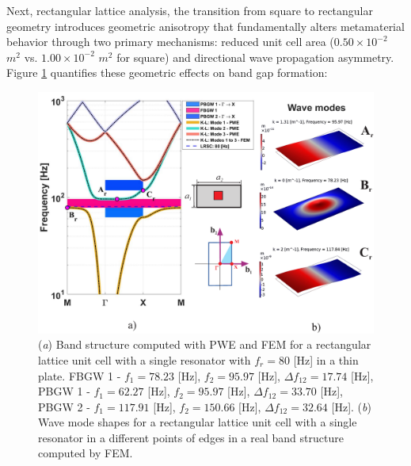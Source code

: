 \documentclass[review,numbers,sort&compress]{elsarticle}
\begin{document}
Next, rectangular lattice analysis, the transition from square to rectangular geometry introduces geometric anisotropy that fundamentally alters metamaterial behavior through two primary mechanisms: reduced unit cell area ($0.50 \times 10^{-2}$ $m^2$ vs. $1.00 \times 10^{-2}$ $m^2$ for square) and directional wave propagation asymmetry. Figure \ref{pwe_fem_disp_modal_rect} quantifies these geometric effects on band gap formation:
\newpage
\begin{figure}[htb]
	\centering
	\includegraphics[width=.8\textwidth]{1_2_disp_frf_rect.pdf}
	\caption{(\textit{a}) Band structure computed with PWE and FEM for a rectangular lattice unit cell with a single resonator with $f_r = 80$ [Hz] in a thin plate. FBGW 1 - $f_1 = 78.23$ [Hz], $f_2 = 95.97$ [Hz], $\Delta f_{12} = 17.74 $ [Hz], PBGW 1 - $f_1 = 62.27$ [Hz], $f_2 = 95.97$ [Hz], $\Delta f_{12} = 33.70 $ [Hz], PBGW 2 - $f_1 = 117.91$ [Hz], $f_2 = 150.66$ [Hz], $\Delta f_{12} = 32.64 $ [Hz]. (\textit{b}) Wave mode shapes for a rectangular lattice unit cell with a single resonator in a different points of edges in a real band structure computed by FEM.}
	\label{pwe_fem_disp_modal_rect}
\end{figure}
\end{document}
